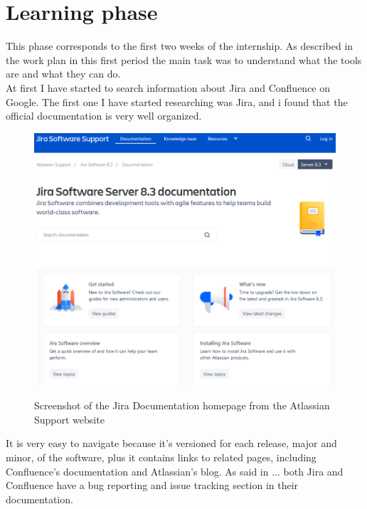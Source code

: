 \section{Learning phase}
	This phase corresponds to the first two weeks of the internship.
	As described in the work plan in this first period the main task was to understand what the tools are and what they can do.\\
	At first I have started to search information about Jira and Confluence on Google.
	The first one I have started researching was Jira, and i found that the official documentation is very well organized.
	\begin{figure}[H]
		\centering
		\includegraphics[width=1\textwidth]{resources/jira_documentation}\\
		\caption{Screenshot of the Jira Documentation homepage from the Atlassian Support website}
	\end{figure}
	It is very easy to navigate because it's versioned for each release, major and minor, of the software, plus it contains links to related pages, including Confluence's documentation and Atlassian's blog.
	As said in ... both Jira and Confluence have a bug reporting and issue tracking section in their documentation.
